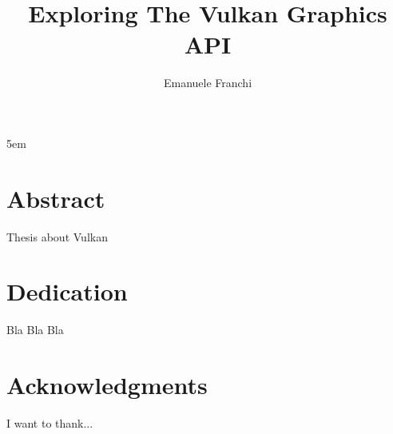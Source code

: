 \documentclass[a4paper]{report}
\author{Emanuele Franchi}
\title{Exploring The Vulkan Graphics API}
\begin{document}
\emergencystretch 5em

\maketitle

\chapter*{Abstract}
Thesis about Vulkan

\chapter*{Dedication}
Bla Bla Bla

\chapter*{Acknowledgments}
I want to thank...

\tableofcontents
\listoffigures
\lstlistoflistings













\appendix




\nocite{*}

\end{document}
